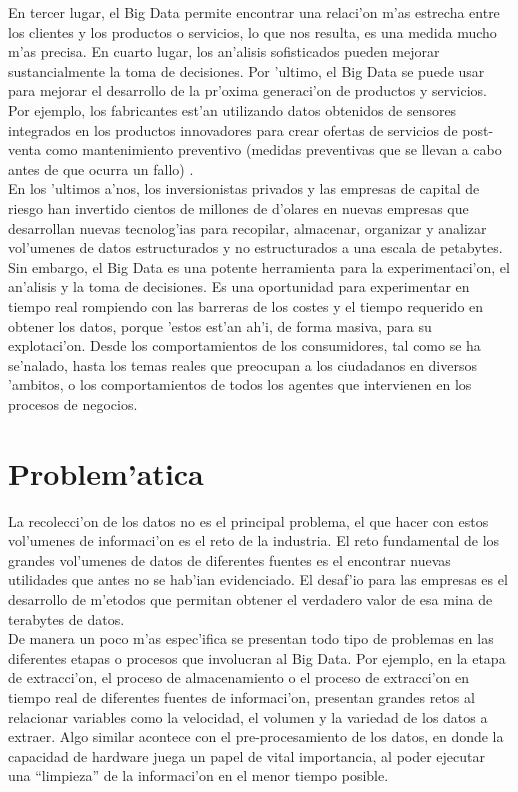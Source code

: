 En tercer lugar, el Big Data permite encontrar una relaci'on m'as estrecha entre los clientes y los productos o servicios, lo que nos resulta, es una medida mucho m'as precisa. En cuarto lugar, los an'alisis sofisticados pueden mejorar sustancialmente la toma de decisiones. Por 'ultimo, el Big Data se puede usar para mejorar el desarrollo de la pr'oxima generaci'on de productos y servicios. Por ejemplo, los fabricantes est'an utilizando datos obtenidos de sensores integrados en los productos innovadores para crear ofertas de servicios de post-venta como mantenimiento preventivo (medidas preventivas que se llevan a cabo antes de que ocurra un fallo) \cite{manyika_big_2011}.\\

En los 'ultimos a'nos, los inversionistas privados y las empresas de capital de riesgo han invertido cientos de millones de d'olares en nuevas empresas que desarrollan nuevas tecnolog'ias para recopilar, almacenar, organizar y analizar vol'umenes de datos estructurados y no estructurados a una escala de petabytes. Sin embargo, el Big Data es una potente herramienta para la experimentaci'on, el an'alisis y la toma de decisiones. Es una oportunidad para experimentar en tiempo real rompiendo con las barreras de los costes y el tiempo requerido en obtener los datos, porque 'estos est'an ah'i, de forma masiva, para su explotaci'on. Desde los comportamientos de los consumidores, tal como se ha se'nalado, hasta los temas reales que preocupan a los ciudadanos en diversos 'ambitos, o los comportamientos de todos los agentes que intervienen en los procesos de negocios.

\section{Problem'atica}
\noindent
La recolecci'on de los datos no es el principal problema, el que hacer con estos vol'umenes de informaci'on es el reto de la industria. El reto fundamental de los grandes vol'umenes de datos de diferentes fuentes es el encontrar nuevas utilidades que antes no se hab'ian evidenciado. El desaf'io para las empresas es el desarrollo de m'etodos que permitan obtener el verdadero valor de esa mina de terabytes de datos.\\

De manera un poco m'as espec'ifica se presentan todo tipo de problemas en las diferentes etapas o procesos que involucran al Big Data. Por ejemplo, en la etapa de extracci'on, el proceso de almacenamiento o el proceso de extracci'on en tiempo real de diferentes fuentes de informaci'on, presentan grandes retos al relacionar variables como la velocidad, el volumen y la variedad de los datos a extraer. Algo similar acontece con el pre-procesamiento de los datos, en donde la capacidad de hardware juega un papel de vital importancia, al poder ejecutar una ``limpieza'' de la informaci'on en el menor tiempo posible.\\

